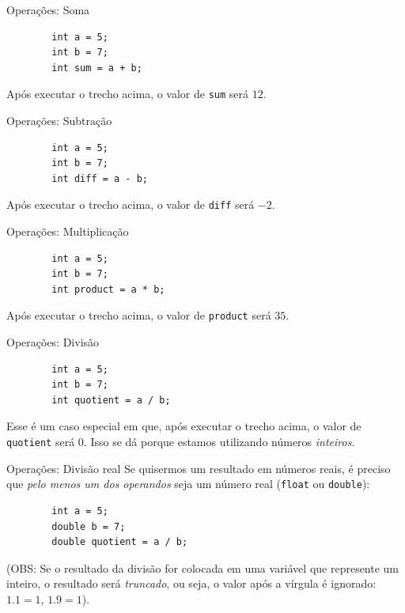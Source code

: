 \documentclass{beamer}
\begin{document}
\begin{frame}[fragile]{Operações: Soma}
    \begin{verbatim}
        int a = 5;
        int b = 7;
        int sum = a + b;
    \end{verbatim}

    Após executar o trecho acima, o valor de \texttt{sum} será $12$.
\end{frame}

\begin{frame}[fragile]{Operações: Subtração}
    \begin{verbatim}
        int a = 5;
        int b = 7;
        int diff = a - b;
    \end{verbatim}

    Após executar o trecho acima, o valor de \texttt{diff} será $-2$.
\end{frame}

\begin{frame}[fragile]{Operações: Multiplicação}
    \begin{verbatim}
        int a = 5;
        int b = 7;
        int product = a * b;
    \end{verbatim}

    Após executar o trecho acima, o valor de \texttt{product} será $35$.
\end{frame}

\begin{frame}[fragile]{Operações: Divisão}
    \begin{verbatim}
        int a = 5;
        int b = 7;
        int quotient = a / b;
    \end{verbatim}

    Esse é um caso especial em que, após executar o trecho acima, o valor de
    \texttt{quotient} será $0$. Isso se dá porque estamos utilizando números
    \emph{inteiros}.
\end{frame}

\begin{frame}[fragile]{Operações: Divisão real}
    Se quisermos um resultado em números reais, é preciso que \emph{pelo menos
    um dos operandos} seja um número real (\texttt{float} ou \texttt{double}):

    \begin{verbatim}
        int a = 5;
        double b = 7;
        double quotient = a / b;
    \end{verbatim}

    (OBS\@: Se o resultado da divisão for colocada em uma variável que
    represente um inteiro, o resultado será \emph{truncado}, ou seja, o valor
    após a vírgula é ignorado: $1.1 = 1$, $1.9 = 1$).
\end{frame}
\end{document}
